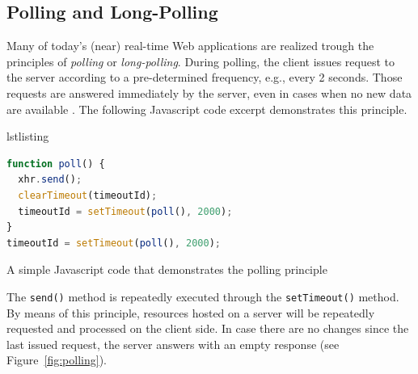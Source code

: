 \documentclass[a4paper, justified, notoc]{tufte-handout} %
\makeatletter
\newenvironment{listing}[1][htbp] %
  {\ifvmode\else\unskip\fi\begin{@tufte@float}[#1]{lstlisting}{}}
  {\end{@tufte@float} } %
\makeatother
\begin{document}


\subsection{Polling and Long-Polling} %
\label{sub:polling}

Many of today's (near) real-time Web applications are realized trough the principles of \emph{polling} or \emph{long-polling}. During polling, the client issues request to the server according to a pre-determined frequency, e.g., every 2 seconds. Those requests are answered immediately by the server, even in cases when no new data are available . %
The following Javascript code excerpt demonstrates this principle. 

\begin{listing}
\begin{lstlisting}[language=JavaScript]
function poll() {
  xhr.send();
  clearTimeout(timeoutId);
  timeoutId = setTimeout(poll(), 2000);
}
timeoutId = setTimeout(poll(), 2000);
\end{lstlisting}
	\caption{A simple Javascript code that demonstrates the polling principle} 
	\label{polling}
\end{listing}

The \texttt{send()} method is repeatedly executed through the \texttt{setTimeout()} method. By means of this principle, resources hosted on a server will be repeatedly requested and processed on the client side.  In case there are no changes since the last issued request, the server answers with an empty response (see Figure~\ref{fig:polling}). 
\end{document}
